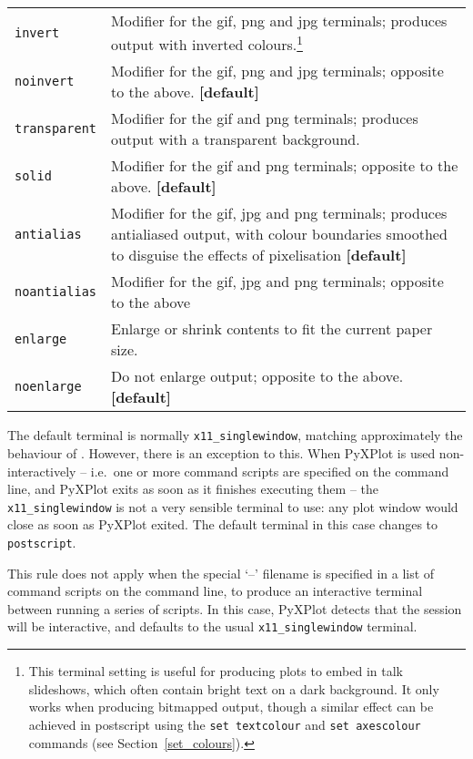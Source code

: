 \begin{longtable}{p{3cm}p{9cm}}
{\tt invert} & Modifier for the gif, png and jpg terminals; produces output with inverted colours.\footnote{This terminal setting is useful for producing plots to embed in talk slideshows, which often contain bright text on a dark background. It only works when producing bitmapped output, though a similar effect can be achieved in postscript using the {\tt set textcolour} and {\tt set axescolour} commands (see Section~\ref{set_colours}).}\index{colours!inverting}\\
{\tt noinvert} & Modifier for the gif, png and jpg terminals; opposite to the above. {\bf [default]}\\
{\tt transparent} & Modifier for the gif and png terminals; produces output with a transparent background.\index{transparent terminal}\index{gif output!transparency}\index{png output!transparency}\\
{\tt solid} & Modifier for the gif and png terminals; opposite to the above. {\bf [default]}\\
{\tt antialias} & Modifier for the gif, jpg and png terminals; produces antialiased output, with colour boundaries smoothed to disguise the effects of pixelisation {\bf [default]}\\
{\tt noantialias} & Modifier for the gif, jpg and png terminals; opposite to the
above\\
{\tt enlarge} & Enlarge or shrink contents to fit the current paper
size.\index{enlarging output}\\
{\tt noenlarge} & Do not enlarge output; opposite to the above. {\bf [default]}\\
\end{longtable}
\label{terminals}

The default terminal is normally {\tt x11\_singlewindow}, matching
approximately the behaviour of \gnuplot. However, there is an exception to this.
When PyXPlot is used non-interactively -- i.e.\ one or more command scripts are
specified on the command line, and PyXPlot exits as soon as it finishes
executing them -- the {\tt x11\_singlewindow} is not a very sensible
terminal to use: any plot window would close as soon as PyXPlot exited. The
default terminal in this case changes to {\tt postscript}.

This rule does not apply when the special `--' filename is specified in a list
of command scripts on the command line, to produce an interactive terminal
between running a series of scripts. In this case, PyXPlot detects that the
session will be interactive, and defaults to the usual
{\tt x11\_singlewindow} terminal.

